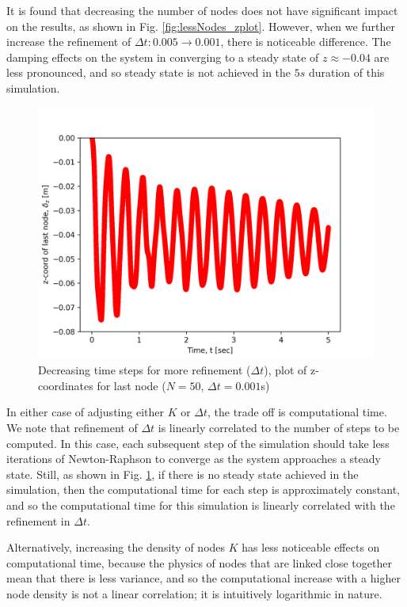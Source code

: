 \documentclass[letterpaper, 10 pt, conference]{ieeeconf}  %
\begin{document}
It is found that decreasing the number of nodes does not have significant impact on the results, as shown in Fig. \ref{fig:lessNodes_zplot}.
However, when we further increase the refinement of $\Delta t: 0.005 \rightarrow 0.001$, there is noticeable difference.
The damping effects on the system in converging to a steady state of $z \approx -0.04$ are less pronounced, and so steady state is not achieved in the $5s$ duration of this simulation.

\begin{figure}[h!]
   \centering
   \includegraphics[width=0.8\linewidth]{../figures/n_50_dt_0-001_z_plot.png}
   \caption{Decreasing time steps for more refinement ($\Delta t$), plot of z-coordinates for last node ($N=50$, $\Delta t = 0.001$s)}
   \label{fig:lessDT_zplot}
\end{figure}

In either case of adjusting either $K$ or $\Delta t$, the trade off is computational time.
We note that refinement of $\Delta t$ is linearly correlated to the number of steps to be computed. 
In this case, each subsequent step of the simulation should take less iterations of Newton-Raphson to converge as the system approaches a steady state.
Still, as shown in Fig. \ref{fig:lessDT_zplot}, if there is no steady state achieved in the simulation, then the computational time for each step is approximately constant, and so the computational time for this simulation is linearly correlated with the refinement in $\Delta t$.

Alternatively, increasing the density of nodes $K$ has less noticeable effects on computational time, because the physics of nodes that are linked close together mean that there is less variance, and so the computational increase with a higher node density is not a linear correlation; it is intuitively logarithmic in nature.
\end{document}
